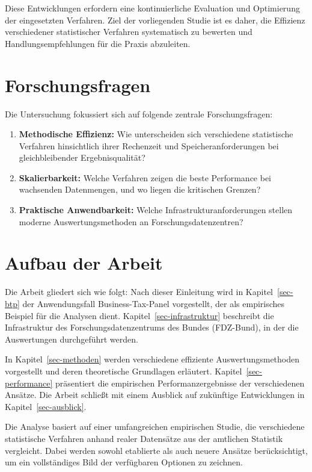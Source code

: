 \documentclass[
  ngerman,
  10pt,
  letterpaper,
  twocolumn]{book}
\begin{document}
Diese Entwicklungen erfordern eine kontinuierliche Evaluation und
Optimierung der eingesetzten Verfahren. Ziel der vorliegenden Studie ist
es daher, die Effizienz verschiedener statistischer Verfahren
systematisch zu bewerten und Handlungsempfehlungen für die Praxis
abzuleiten.

\section{Forschungsfragen}\label{forschungsfragen-1}

Die Untersuchung fokussiert sich auf folgende zentrale Forschungsfragen:

\begin{enumerate}
\def\labelenumi{\arabic{enumi}.}
\item
  \textbf{Methodische Effizienz:} Wie unterscheiden sich verschiedene
  statistische Verfahren hinsichtlich ihrer Rechenzeit und
  Speicheranforderungen bei gleichbleibender Ergebnisqualität?
\item
  \textbf{Skalierbarkeit:} Welche Verfahren zeigen die beste Performance
  bei wachsenden Datenmengen, und wo liegen die kritischen Grenzen?
\item
  \textbf{Praktische Anwendbarkeit:} Welche Infrastrukturanforderungen
  stellen moderne Auswertungsmethoden an Forschungsdatenzentren?
\end{enumerate}

\section{Aufbau der Arbeit}\label{aufbau-der-arbeit-1}

Die Arbeit gliedert sich wie folgt: Nach dieser Einleitung wird in
Kapitel~\ref{sec-btp} der Anwendungsfall Business-Tax-Panel vorgestellt,
der als empirisches Beispiel für die Analysen dient.
Kapitel~\ref{sec-infrastruktur} beschreibt die Infrastruktur des
Forschungsdatenzentrums des Bundes (FDZ-Bund), in der die Auswertungen
durchgeführt werden.

In Kapitel~\ref{sec-methoden} werden verschiedene effiziente
Auswertungsmethoden vorgestellt und deren theoretische Grundlagen
erläutert. Kapitel~\ref{sec-performance} präsentiert die empirischen
Performanzergebnisse der verschiedenen Ansätze. Die Arbeit schließt mit
einem Ausblick auf zukünftige Entwicklungen in
Kapitel~\ref{sec-ausblick}.

Die Analyse basiert auf einer umfangreichen empirischen Studie, die
verschiedene statistische Verfahren anhand realer Datensätze aus der
amtlichen Statistik vergleicht. Dabei werden sowohl etablierte als auch
neuere Ansätze berücksichtigt, um ein vollständiges Bild der verfügbaren
Optionen zu zeichnen.
\end{document}
